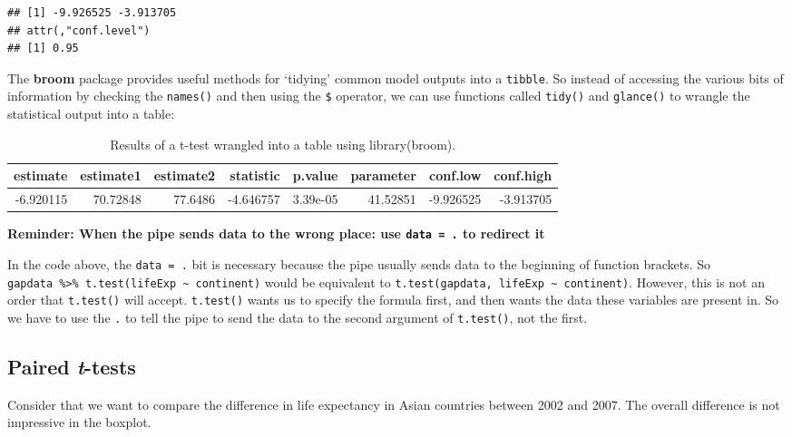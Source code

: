 \documentclass[
  12pt,
  krantz2]{krantz}
\begin{document}
\begin{verbatim}
## [1] -9.926525 -3.913705
## attr(,"conf.level")
## [1] 0.95
\end{verbatim}

The \textbf{broom} package provides useful methods for `tidying' common model outputs into a \texttt{tibble}.
So instead of accessing the various bits of information by checking the \texttt{names()} and then using the \texttt{\$} operator, we can use functions called \texttt{tidy()} and \texttt{glance()} to wrangle the statistical output into a table:

\begin{table}

\caption{\label{tab:chap06-tab-ttest}Results of a t-test wrangled into a table using library(broom).}
\centering
\fontsize{9}{11}\selectfont
\begin{tabular}[t]{rrrrrrrr}
\toprule
estimate & estimate1 & estimate2 & statistic & p.value & parameter & conf.low & conf.high\\
\midrule
-6.920115 & 70.72848 & 77.6486 & -4.646757 & 3.39e-05 & 41.52851 & -9.926525 & -3.913705\\
\bottomrule
\end{tabular}
\end{table}

\textbf{Reminder: When the pipe sends data to the wrong place: use \texttt{data\ =\ .} to redirect it}

In the code above, the \texttt{data\ =\ .} bit is necessary because the pipe usually sends data to the beginning of function brackets.
So \texttt{gapdata\ \%\textgreater{}\%\ t.test(lifeExp\ \textasciitilde{}\ continent)} would be equivalent to \texttt{t.test(gapdata,\ lifeExp\ \textasciitilde{}\ continent)}.
However, this is not an order that \texttt{t.test()} will accept.
\texttt{t.test()} wants us to specify the formula first, and then wants the data these variables are present in.
So we have to use the \texttt{.} to tell the pipe to send the data to the second argument of \texttt{t.test()}, not the first.

\hypertarget{ttest_paired}{%
\subsection{\texorpdfstring{Paired \emph{t}-tests}{Paired t-tests}}\label{ttest_paired}}


Consider that we want to compare the difference in life expectancy in Asian countries between 2002 and 2007.
The overall difference is not impressive in the boxplot.
\end{document}
